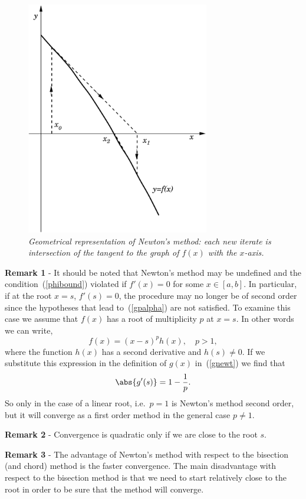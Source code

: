 \begin{figure}
  \centerline{\includegraphics[width=80mm]{figures/Newton}}
  \caption{\label{fig:Newton} \it Geometrical representation of
    Newton's method: each new iterate is intersection of the tangent
    to the graph of $f(x)$ with the $x$-axis.}
\end{figure}

\noindent
\textbf{Remark 1} - It should be noted that Newton's method may be
undefined and the condition~(\ref{phibound}) violated if $f'(x)=0$ for
some $x \in [a,b]$.  In particular, if at the root $x=s$, $f'(s) = 0$,
the procedure may no longer be of second order since the hypotheses
that lead to~(\ref{gpalpha}) are not satisfied.  To examine this case
we assume that $f(x)$ has a root of multiplicity $p$ at $x=s$.  In
other words we can write,
%
\begin{equation*}
  f(x) = (x-s)^p h(x), \quad p > 1 ,
\end{equation*}
%
where the function $h(x)$ has a second derivative and $h(s) \ne 0$.
If we substitute this expression in the definition of $g(x)$
in~(\ref{gnewt}) we find that
%
\begin{equation*}
  \abs{g'(s)} = 1 - \frac{1}{p} .
\end{equation*}
%
So only in the case of a linear root, i.e.\ $p=1$ is Newton's method
second order, but it will converge as a first order method in the
general case $p \ne 1$.

\noindent
\textbf{Remark 2} - Convergence is quadratic only if we are close to
the root $s$.

\noindent
\textbf{Remark 3} - The advantage of Newton's method with respect to
the bisection (and chord) method is the faster convergence.  The main
disadvantage with respect to the bisection method is that we need to
start relatively close to the root in order to be sure that the method
will converge.

